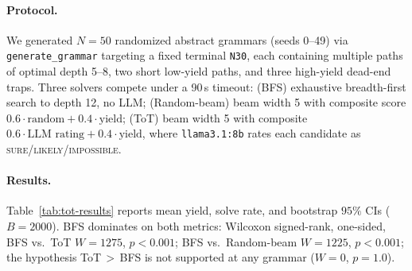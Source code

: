 \documentclass[letterpaper,twocolumn,10pt]{article}
\theoremstyle{definition}
\theoremstyle{remark}
\begin{document}
\paragraph{Protocol.}
We generated $N = 50$ randomized abstract grammars (seeds 0--49) via
\texttt{generate\_grammar} targeting a fixed terminal \texttt{N30}, each
containing multiple paths of optimal depth 5--8, two short low-yield
paths, and three high-yield dead-end traps.
Three solvers compete under a 90\,s timeout: (BFS) exhaustive
breadth-first search to depth 12, no LLM; (Random-beam) beam width 5
with composite score $0.6\cdot\text{random} + 0.4\cdot\text{yield}$;
(ToT) beam width 5 with composite $0.6\cdot\text{LLM rating} +
0.4\cdot\text{yield}$, where \texttt{llama3.1:8b} rates each candidate as
\textsc{sure}/\textsc{likely}/\textsc{impossible}.

\paragraph{Results.}
Table~\ref{tab:tot-results} reports mean yield, solve rate, and
bootstrap $95\%$ CIs ($B = 2000$).
BFS dominates on both metrics: Wilcoxon signed-rank, one-sided,
BFS vs.\ ToT $W = 1275$, $p < 0.001$; BFS vs.\ Random-beam $W = 1225$,
$p < 0.001$; the hypothesis ToT$\,>\,$BFS is not supported at any
grammar ($W = 0$, $p = 1.0$).

\begin{table}[t]
\centering
\caption{Tree-of-Thought benchmark results ($N = 50$ randomized
grammars, seeds 0--49, model \texttt{llama3.1:8b}, 90\,s timeout per
solver; unsolved grammars contribute yield $= 0$; 95\% CIs are
bootstrap intervals, $B = 2000$).}
\label{tab:tot-results}
\setlength{\tabcolsep}{4pt}
\end{table}
\end{document}
